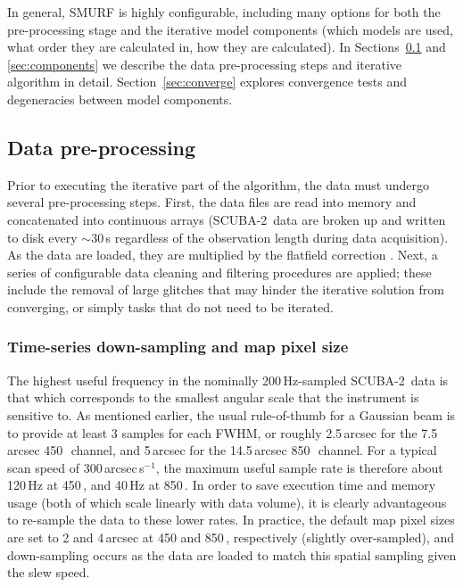 \documentclass[useAMS,usenatbib,nofootinbib]{mn2e}
\newcommand{\scuba}{SCUBA-2}
\begin{document}
In general, SMURF is highly configurable, including many options for
both the pre-processing stage and the iterative model components
(which models are used, what order they are calculated in, how they
are calculated).  In Sections~\ref{sec:dataprep} and
\ref{sec:components} we describe the data pre-processing steps and
iterative algorithm in detail. Section~\ref{sec:converge} explores
convergence tests and degeneracies between model components.


\subsection{Data pre-processing}
\label{sec:dataprep}

Prior to executing the iterative part of the algorithm, the data must
undergo several pre-processing steps. First, the data files are read
into memory and concatenated into continuous arrays (\scuba\ data are
broken up and written to disk every $\sim$30\,s regardless of the
observation length during data acquisition). As the data are loaded,
they are multiplied by the flatfield correction \citep[see Section~2.1
in][]{dempsey2012}. Next, a series of configurable data cleaning and
filtering procedures are applied; these include the removal of large
glitches that may hinder the iterative solution from converging, or
simply tasks that do not need to be iterated.

\subsubsection{Time-series down-sampling and map pixel size}
\label{sec:downsamp}

The highest useful frequency in the nominally 200\,Hz-sampled \scuba\
data is that which corresponds to the smallest angular scale that the
instrument is sensitive to. As mentioned earlier, the usual
rule-of-thumb for a Gaussian beam is to provide at least 3 samples for
each FWHM, or roughly 2.5\,arcsec for the 7.5\,arcsec 450\,\micron\
channel, and 5\,arcsec for the 14.5\,arcsec 850\,\micron\ channel. For
a typical scan speed of 300\,arcsec\,s$^{-1}$, the maximum useful
sample rate is therefore about 120\,Hz at 450\,\micron, and 40\,Hz at
850\,\micron. In order to save execution time and memory usage (both
of which scale linearly with data volume), it is clearly advantageous
to re-sample the data to these lower rates. In practice, the default
map pixel sizes are set to 2 and 4\,arcsec at 450 and 850\,\micron,
respectively (slightly over-sampled), and down-sampling occurs as the
data are loaded to match this spatial sampling given the slew speed.
\end{document}
